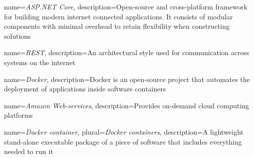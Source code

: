 {
	name=\textit{ASP.NET Core},
	description={Open-source and cross-platform framework for building modern internet connected applications. It consists of modular components with minimal overhead to retain flexibility when constructing solutions}
}

{
	name=\textit{REST},
	description={An architectural style used for communication across systems on the internet}
}

{
	name=\textit{Docker},
	description={Docker is an open-source project that automates the deployment of applications inside software containers}
}

{
	name=\textit{Amazon Web-services},
	description={Provides on-demand cloud computing platforms}
}

{
	name=\textit{Docker container},
	plural=\textit{Docker containers},
	description={A lightweight stand-alone executable package of a piece of software that includes everything needed to run it}
}










